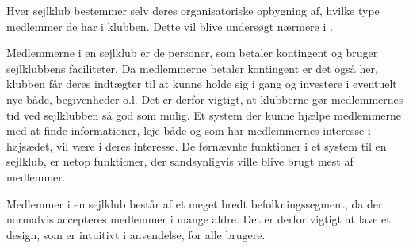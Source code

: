 Hver sejlklub bestemmer selv deres organisatoriske opbygning af, hvilke type medlemmer de har i klubben.
Dette vil blive undersøgt nærmere i . 

Medlemmerne i en sejlklub er de personer, som betaler kontingent og bruger sejlklubbens faciliteter.  
Da medlemmerne betaler kontingent er det også her, klubben får deres indtægter til at kunne holde sig i gang og investere i eventuelt nye både, begivenheder o.l. 
Det er derfor vigtigt, at klubberne gør medlemmernes tid ved sejlklubben så god som mulig. 
Et system der kunne hjælpe medlemmerne med at finde informationer, leje både og som har medlemmernes interesse i højsædet, vil være i deres interesse.
De førnævnte funktioner i et system til en sejlklub, er netop funktioner, der sandsynligvis ville blive brugt mest af medlemmer.

Medlemmer i en sejlklub består af et meget bredt befolkningssegment, da der normalvis accepteres medlemmer i mange aldre.
Det er derfor vigtigt at lave et design, som er intuitivt i anvendelse, for alle brugere.



